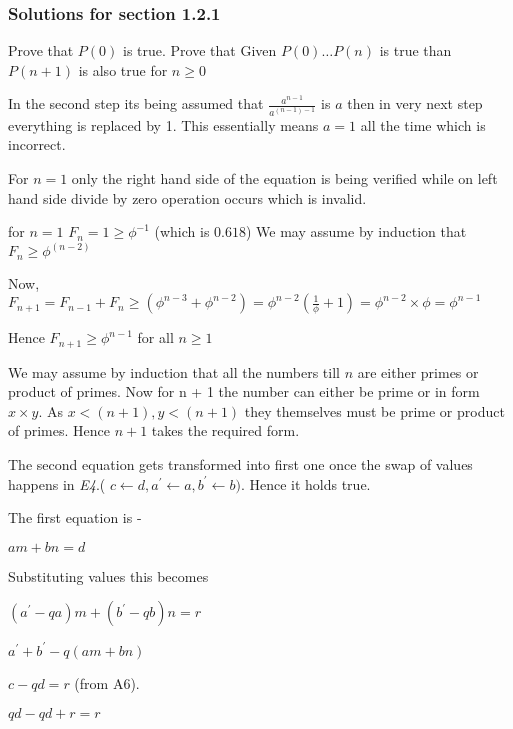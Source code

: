 \documentclass[12pt]{article}
\begin{document}
\subsubsection{Solutions for section 1.2.1}
\begin{enumerate}
  \begin{item}
    Prove that $P(0)$ is true.
    Prove that Given $P(0) \ldots P(n)$ is true than $ P(n+1) $ is also true for $n \ge 0$
  \end{item}

  \begin{item}
    In the second step its being assumed that $ \frac{a^{n-1}}{a^{(n-1)-1}} $ is $a$ then in very next step everything is replaced by 1. This essentially means $a = 1$ all the time which is incorrect.
  \end{item}
  
  \begin{item}
    For $n = 1$ only the right hand side of the equation is being verified while on left hand side divide by zero operation occurs which is invalid.
  \end{item}

  \begin{item}
    for $n=1$ $F_n = 1 \ge \phi^{-1}$ (which is $0.618$)
    We may assume by induction that $F_n \ge \phi^{(n-2)}$

    Now, $F_{n+1} = F_{n-1} + F_n \ge (\phi^{n-3} + \phi^{n-2}) = \phi^{n-2}(\frac{1}{\phi} + 1) =
    \phi^{n-2} \times \phi = \phi^{n-1}$

    Hence $F_{n+1} \ge \phi^{n-1} $ for all $ n \ge 1 $
    
  \end{item}
  \begin{item}
    We may assume by induction that all the numbers till $n$ are either primes or product of primes. Now for n + 1 the number can either be prime or in form $x \times y$. As $x < (n + 1), y < (n+1)$ they themselves must be prime or product of primes. Hence $n+1$ takes the required form.
  \end{item}

  \begin{item}
    The second equation gets transformed into first one once the swap of values happens in {\it{E4}}.( $c \leftarrow d, a^\prime \leftarrow a, b^\prime \leftarrow b )$. Hence it holds true.

    The first equation is -

    $am + bn  = d $

    Substituting values this becomes

    $ (a^{\prime} - qa)m + (b^\prime - qb)n = r$

    $ a^{\prime} + b^{\prime} - q(am + bn)$

    $ c - qd =  r $ (from A6).

    $ qd - qd + r = r$

  \end{item}
  
\end{enumerate}
\end{document}
